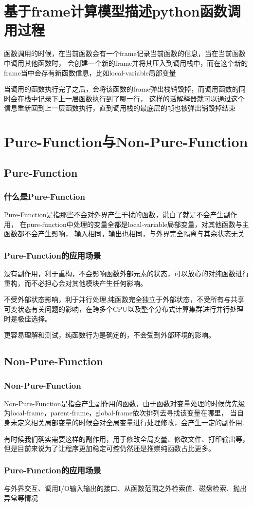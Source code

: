 \documentclass[10pt]{article}
\begin{document}
	\section{基于frame计算模型描述python函数调用过程}
	函数调用的时候，在当前函数会有一个frame记录当前函数的信息，当在当前函数中调用其他函数时，
	会创建一个新的frame并将其压入到调用栈中，而在这个新的frame当中会存有新函数信息，比如local-variable局部变量\par
	当调用的函数执行完了之后，会将该函数的frame弹出栈销毁掉，而调用函数的同时会在栈中记录下上一层函数执行到了哪一行，
	这样的话解释器就可以通过这个信息重新回到上一层函数执行，直到调用栈的最底层的帧也被弹出销毁掉结束
	\section{Pure-Function与Non-Pure-Function}
	\subsection{Pure-Function}
	\subsubsection{什么是Pure-Function}
	Pure-Function是指那些不会对外界产生干扰的函数，说白了就是不会产生副作用，
	在pure-function中处理的变量全都是local-variable局部变量，对其他函数与主函数都不会产生影响，
	输入相同，输出也相同，与外界完全隔离与其余状态无关
	\subsubsection{Pure-Function的应用场景}
	没有副作用，利于重构，不会影响函数外部元素的状态，可以放心的对纯函数进行重构，而不必担心会对其他模块产生任何影响。\par
	不受外部状态影响，利于并行处理,纯函数完全独立于外部状态，不受所有与共享可变状态有关问题的影响，在跨多个CPU以及整个分布式计算集群进行并行处理时是极佳选择。\par
	更容易理解和测试，纯函数行为是确定的，不会受到外部环境的影响。\par
	\subsection{Non-Pure-Function}
	\subsubsection{Non-Pure-Function}
	Non-Pure-Function是指会产生副作用的函数，由于函数对变量处理的时候优先级为local-frame，parent-frame，global-frame依次排列去寻找该变量在哪里，
	当自身未定义相关局部变量的时候会对全局变量进行处理修改，会产生一定的副作用.\par
	有时候我们确实需要这样的副作用，用于修改全局变量、修改文件、打印输出等，但是目前来说为了让程序更加稳定可控仍然还是推崇纯函数占比更多。
	\subsubsection{Pure-Function的应用场景}
	与外界交互、调用I/O输入输出的接口、从函数范围之外检索值、磁盘检索、抛出异常等情况
	
\end{document}
